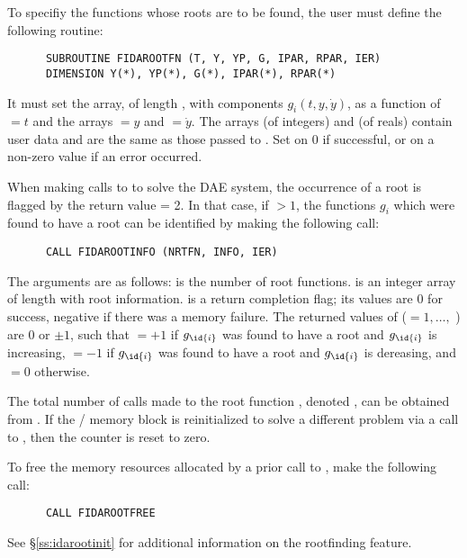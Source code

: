 To specifiy the functions whose roots are to be found, the user must
define the following routine:
\begin{verbatim}
      SUBROUTINE FIDAROOTFN (T, Y, YP, G, IPAR, RPAR, IER)
      DIMENSION Y(*), YP(*), G(*), IPAR(*), RPAR(*)
\end{verbatim}
It must set the  array, of length , with components
$g_i(t,y,\dot{y})$, as a function of  $= t$ and the arrays  $= y$
and  $= \dot{y}$.
The arrays  (of integers) and  (of reals) contain user data
and are the same as those passed to .
Set  on 0 if successful, or on a non-zero value if an error occurred.

When making calls to  to solve the DAE system, the occurrence
of a root is flagged by the return value  = 2.  In that case, if
 $> 1$, the functions $g_i$ which were found to have a root can
be identified by making the following call:
\begin{verbatim}
      CALL FIDAROOTINFO (NRTFN, INFO, IER)
\end{verbatim}
The arguments are as follows:  is the number of root functions.
 is an integer array of length  with root information.
 is a return completion flag; its values are $0$ for success,
negative if there was a memory failure.  The returned values of 
($ = 1,\ldots,$ ) are $0$ or $\pm 1$, such that
 $ = +1$ if $g_{\id{i}}$ was found to have a root and $g_{\id{i}}$ is increasing,
 $ = -1$ if $g_{\id{i}}$ was found to have a root and $g_{\id{i}}$ is dereasing,
and  $ = 0$ otherwise.

The total number of calls made to the root function ,
denoted , can be obtained from .
If the {\fida}/{\ida} memory block is reinitialized to solve a
different problem via a call to , then the counter
 is reset to zero.

To free the memory resources allocated by a prior call to , make
the following call:
\begin{verbatim}
      CALL FIDAROOTFREE
\end{verbatim}
See \S\ref{ss:idarootinit} for additional information on the
rootfinding feature.



